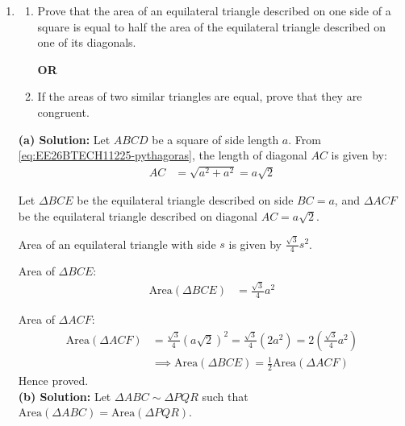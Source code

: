 \begin{enumerate}[label=\thesubsection.\arabic*, ref=\thesubsection.\theenumi]
    \item 
    \begin{enumerate}[label=(\alph*), leftmargin=1.5em, labelsep=0.5em]
        \item Prove that the area of an equilateral triangle described on one side of a square is equal to half the area of the equilateral triangle described on one of its diagonals.
        
        \vspace{0.5em}
        \begin{center}
            \textbf{OR}
        \end{center}
        \vspace{0.5em}

        \item If the areas of two similar triangles are equal, prove that they are congruent.	\\[2pt]
    \end{enumerate}
    \noindent\textbf{(a) Solution:} Let $ABCD$ be a square of side length $a$.
From \eqref{eq:EE26BTECH11225-pythagoras}, the length of diagonal $AC$ is given by:
\begin{align}
    AC &= \sqrt{a^2 + a^2} = a\sqrt{2}
\end{align}

\begin{center}
    
    \label{fig:square_triangles_q17}
\end{center} \vspace{2pt}

Let $\Delta BCE$ be the equilateral triangle described on side $BC = a$, and $\Delta ACF$ be the equilateral triangle described on diagonal $AC = a\sqrt{2}$.

Area of an equilateral triangle with side $s$ is given by $\frac{\sqrt{3}}{4} s^2$.

Area of $\Delta BCE$:
\begin{align}
    \text{Area}(\Delta BCE) &= \frac{\sqrt{3}}{4} a^2
\end{align}

Area of $\Delta ACF$:
\begin{align}
    \text{Area}(\Delta ACF) &= \frac{\sqrt{3}}{4} (a\sqrt{2})^2 = \frac{\sqrt{3}}{4} (2a^2) = 2 \left( \frac{\sqrt{3}}{4} a^2 \right) \\
    &\implies \text{Area}(\Delta BCE) = \frac{1}{2} \text{Area}(\Delta ACF)
\end{align}
Hence proved. \\[8pt]
\noindent\textbf{(b) Solution:} Let $\Delta ABC \sim \Delta PQR$ such that $\text{Area}(\Delta ABC) = \text{Area}(\Delta PQR)$.


\end{enumerate}
